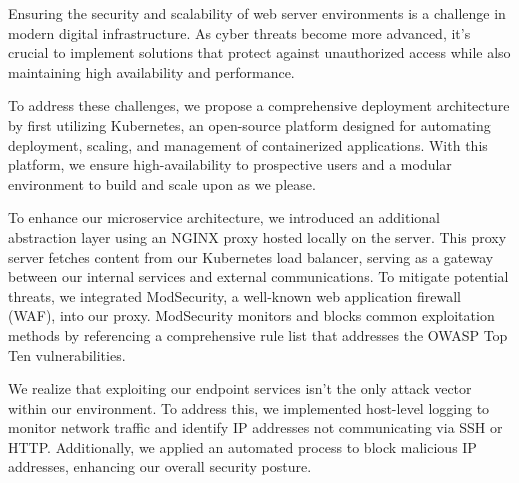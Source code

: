 Ensuring the security and scalability of web server environments is a challenge in modern digital infrastructure. 
As cyber threats become more advanced, it's crucial to implement solutions that protect against unauthorized access 
while also maintaining high availability and performance. 

To address these challenges, we propose a comprehensive deployment architecture by first utilizing Kubernetes, an open-source platform designed for automating deployment, scaling, 
and management of containerized applications. With this platform, we ensure high-availability to prospective users and a modular
environment to build and scale upon as we please. 

To enhance our microservice architecture, we introduced an additional abstraction layer using an NGINX proxy hosted locally on the server. 
This proxy server fetches content from our Kubernetes load balancer, serving as a gateway between our internal services and external communications. 
To mitigate potential threats, we integrated ModSecurity, a well-known web application firewall (WAF), into our proxy. 
ModSecurity monitors and blocks common exploitation methods by referencing a comprehensive rule list that addresses the OWASP Top Ten vulnerabilities.

We realize that exploiting our endpoint services isn't the only attack vector within our environment. 
To address this, we implemented host-level logging to monitor network traffic and identify IP addresses not communicating via SSH or HTTP. 
Additionally, we applied an automated process to block malicious IP addresses, enhancing our overall security posture.

